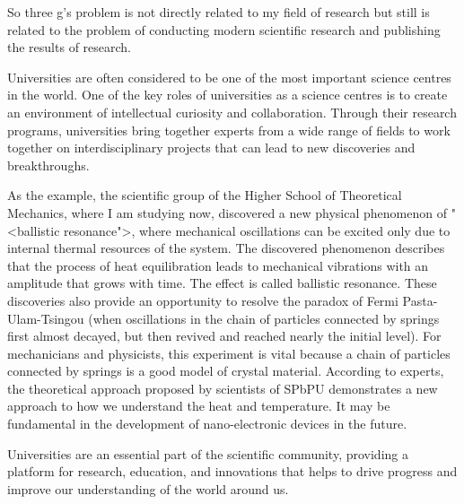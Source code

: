 \documentclass[main.tex]{subfiles}
\begin{document}
So three g's problem is not directly related to my field of research but still is related to the problem of conducting modern scientific research and publishing the results of research.
\\


\newpage


\setcounter{subsection}{4}

Universities are often considered to be one of the most important science centres in the world.
One of the key roles of universities as a science centres is to create an environment of intellectual curiosity and collaboration.
Through their research programs, universities bring together experts from a wide range of fields to work together on interdisciplinary projects that can lead to new discoveries and breakthroughs.

As the example, the scientific group of the Higher School of Theoretical Mechanics, where I am studying now, discovered a new physical phenomenon of "<ballistic resonance">, where mechanical oscillations can be excited only due to internal thermal resources of the system.
The discovered phenomenon describes that the process of heat equilibration leads to mechanical vibrations with an amplitude that grows with time.
The effect is called ballistic resonance.
These discoveries also provide an opportunity to resolve the paradox of Fermi Pasta-Ulam-Tsingou (when oscillations in the chain of particles connected by springs first almost decayed, but then revived and reached nearly the initial level).
For mechanicians and physicists, this experiment is vital because a chain of particles connected by springs is a good model of crystal material.
According to experts, the theoretical approach proposed by scientists of SPbPU demonstrates a new approach to how we understand the heat and temperature.
It may be fundamental in the development of nano-electronic devices in the future.

Universities are an essential part of the scientific community, providing a platform for research, education, and innovations that helps to drive progress and improve our understanding of the world around us.
\\


\newpage
\end{document}
